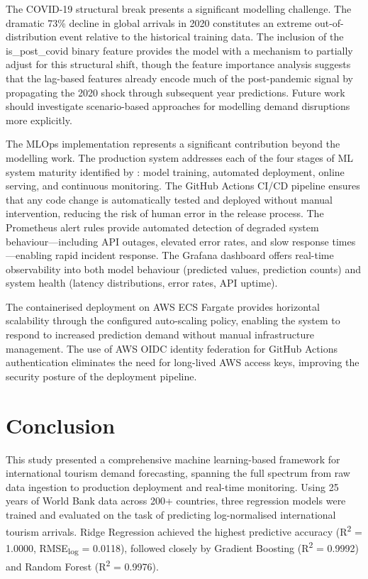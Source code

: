 \documentclass[conference]{IEEEtran}
\begin{document}
The COVID-19 structural break presents a significant
modelling challenge. The dramatic 73\% decline in global
arrivals in 2020 constitutes an extreme out-of-distribution
event relative to the historical training data. The
inclusion of the is\_post\_covid binary feature provides
the model with a mechanism to partially adjust for this
structural shift, though the feature importance analysis
suggests that the lag-based features already encode
much of the post-pandemic signal by propagating the 2020
shock through subsequent year predictions. Future work
should investigate scenario-based approaches for modelling
demand disruptions more explicitly.

The MLOps implementation represents a significant
contribution beyond the modelling work. The production
system addresses each of the four stages of ML system
maturity identified by \cite{kreuzberger2023}: model
training, automated deployment, online serving, and
continuous monitoring. The GitHub Actions CI/CD pipeline
ensures that any code change is automatically tested and
deployed without manual intervention, reducing the risk of
human error in the release process. The Prometheus alert
rules provide automated detection of degraded system
behaviour---including API outages, elevated error rates,
and slow response times---enabling rapid incident response.
The Grafana dashboard offers real-time observability into
both model behaviour (predicted values, prediction counts)
and system health (latency distributions, error rates,
API uptime).

The containerised deployment on AWS ECS Fargate provides
horizontal scalability through the configured auto-scaling
policy, enabling the system to respond to increased
prediction demand without manual infrastructure
management. The use of AWS OIDC identity federation for
GitHub Actions authentication eliminates the need for
long-lived AWS access keys, improving the security posture
of the deployment pipeline.

\section{Conclusion}

This study presented a comprehensive machine
learning-based framework for international tourism demand
forecasting, spanning the full spectrum from raw data
ingestion to production deployment and real-time
monitoring. Using 25 years of World Bank data across
200+ countries, three regression models were trained and
evaluated on the task of predicting log-normalised
international tourism arrivals. Ridge Regression achieved
the highest predictive accuracy (R\textsuperscript{2} =
1.0000, RMSE\textsubscript{log} = 0.0118), followed
closely by Gradient Boosting (R\textsuperscript{2} =
0.9992) and Random Forest (R\textsuperscript{2} = 0.9976).
\end{document}
